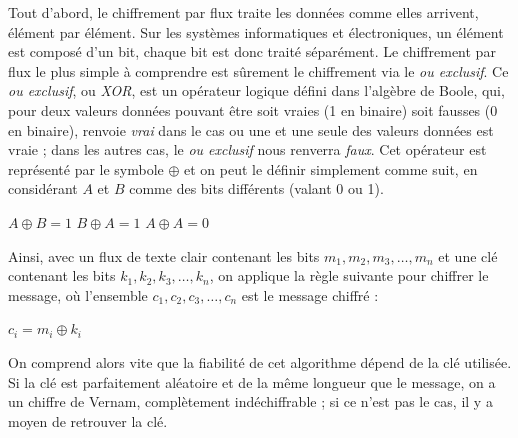 \label{syst:XOR}
Tout d'abord, le chiffrement par flux traite les données comme elles
arrivent, élément par élément. Sur les systèmes informatiques et
électroniques, un élément est composé d'un bit, chaque bit est donc
traité séparément. Le chiffrement par flux le plus simple à comprendre
est sûrement le chiffrement via le \emph{ou exclusif}. Ce \emph{ou
  exclusif}, ou \emph{XOR}, est un opérateur logique défini dans
l'algèbre de Boole, qui, pour deux valeurs données pouvant être soit
vraies (1 en binaire) soit fausses (0 en binaire), renvoie \emph{vrai}
dans le cas ou une et une seule des valeurs données est vraie ; dans
les autres cas, le \emph{ou exclusif} nous renverra \emph{faux}. Cet
opérateur est représenté par le symbole $\oplus$ et on peut le définir
simplement comme suit, en considérant $A$ et $B$ comme des bits
différents (valant 0
ou 1).
\begin{center}
  $A \oplus B = 1$ \hspace{1.5cm} $B \oplus A = 1$ \hspace{1.5cm} $A
\oplus A = 0$ 
\end{center} 

Ainsi, avec un flux de texte clair contenant les bits $m_1,
m_2, m_3, \dots, m_n$ et une clé contenant les bits $k_1, k_2, k_3,
\dots, k_n$, on applique la règle suivante pour chiffrer le message,
où l'ensemble $c_1, c_2, c_3, \dots, c_n$ est le message chiffré :
\begin{center}
$c_i = m_i \oplus k_i$
\end{center}

On comprend alors vite que la fiabilité de cet algorithme dépend de
la clé utilisée. Si la clé est parfaitement aléatoire et de la
même longueur que le message, on a un chiffre de Vernam, complètement
indéchiffrable ; si ce n'est pas le cas, il y a moyen de retrouver la
clé.



